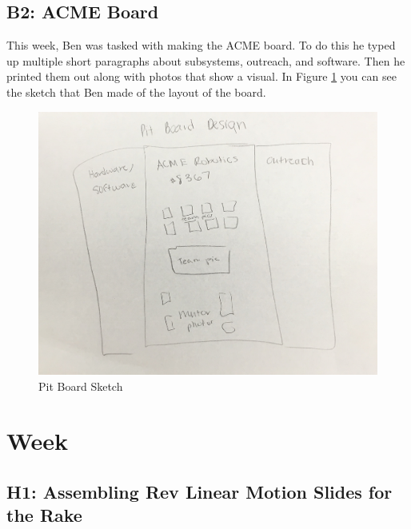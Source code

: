 \documentclass{article}
\begin{document}
\subsection{B2: ACME Board}

This week, Ben was tasked with making the ACME board. To do this he typed up multiple short paragraphs about subsystems, outreach, and software. Then he printed them out along with photos that show a visual. In Figure \ref{fig:pitboard} you can see the sketch that Ben made of the layout of the board. 

\begin{figure}
    \centering
    \includegraphics[width=.6 \textwidth]{10_11-05/images/pit_board.jpg}
    \caption{Pit Board Sketch}
    \label{fig:pitboard}
\end{figure}
\clearpage \newpage \section{Week \thesection} 
\subsection{H1: Assembling Rev Linear Motion Slides for the Rake}
\end{document}
